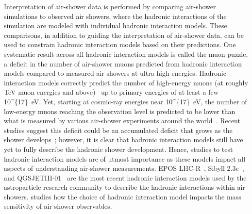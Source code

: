 Interpretation of air-shower data is performed by comparing air-shower simulations to observed air showers, where the hadronic interactions of the simulation are modeled with individual hadronic interaction models.
These comparisons, in addition to guiding the interpretation of air-shower data, can be used to constrain hadronic interaction models based on their predictions.
One systematic result across all hadronic interaction models is called the muon puzzle, a deficit in the number of air-shower muons predicted from hadronic interaction models compared to measured air showers at ultra-high energies.
Hadronic interaction models correctly predict the number of high-energy muons (at roughly TeV muon energies and above)~\cite{icecube_prd2025_tevmuons} up to primary energies of at least a few \qty[parse-numbers=false]{10^{17}}{\electronvolt}.
Yet, starting at cosmic-ray energies near \qty[parse-numbers=false]{10^{17}}{\electronvolt}, the number of low-energy muons reaching the observation level is predicted to be lower than what is measured by various air-shower experiments around the world~\cite{icrc2023_arteaga_muonpuzzle}.
Recent studies suggest this deficit could be an accumulated deficit that grows as the shower develops~\cite{auger_prl2021_muonfluctuations}; however, it is clear that hadronic interaction models still have yet to fully describe the hadronic shower development.
Hence, studies to test hadronic interaction models are of utmost importance as these models impact all aspects of understanding air-shower measurements.
EPOS LHC-R~\cite{icrc2025_pierog}, Sibyll 2.3e~\cite{riehn_prd2019_sibyll23d}, and QGSJETIII-01~\cite{ostapchenko_prd2024_qgsjet3_formalism,ostapchenko_prd2024_qgsjet3_production} are the most recent hadronic interaction models used by the astroparticle research community to describe the hadronic interactions within air showers.
 studies how the choice of hadronic interaction model impacts the mass sensitivity of air-shower observables.

